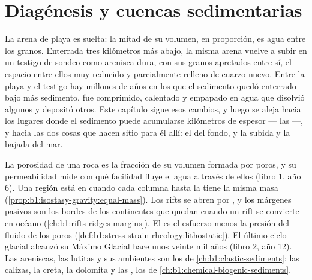 \chapter{Diagénesis y cuencas sedimentarias}\label{ch:b1:diagenesis-basins}

La arena de playa es suelta: la mitad de su volumen, en proporción, es agua entre los granos. Enterrada tres kilómetros más abajo, la misma arena vuelve a subir en un testigo
de sondeo como arenisca dura, con sus granos apretados entre sí, el espacio entre ellos muy reducido y parcialmente relleno de cuarzo nuevo. Entre la playa y el testigo hay millones
de años en los que el sedimento quedó enterrado bajo más sedimento, fue comprimido, calentado y empapado en agua que disolvió algunos  y depositó otros. Este capítulo sigue
esos cambios, y luego se aleja hacia los lugares donde el sedimento puede acumularse kilómetros de espesor --- las  ---, y hacia las dos cosas que hacen sitio
para él allí: el  del fondo, y la subida y la bajada del mar.

\begin{recall}
La porosidad de una roca es la fracción de su volumen formada por poros, y su permeabilidad mide con qué facilidad fluye el agua a través de ellos (libro 1, año 6). Una región está en
 cuando cada columna hasta la  tiene la misma masa (\cref{prop:b1:isostasy-gravity:equal-mass}). Los rifts se abren por , y los márgenes
pasivos son los bordes de los continentes que quedan cuando un rift se convierte en océano (\cref{ch:b1:rifts-ridges-margins}). El  es el esfuerzo menos la presión del fluido
de los poros (\cref{def:b1:stress-strain-rheology:lithostatic}). El último ciclo glacial alcanzó su Máximo Glacial hace unos veinte mil años (libro 2, año 12). Las areniscas, las lutitas y sus
ambientes son los de \cref{ch:b1:clastic-sediments}; las calizas, la creta, la dolomita y las , los de \cref{ch:b1:chemical-biogenic-sediments}.
\end{recall}

